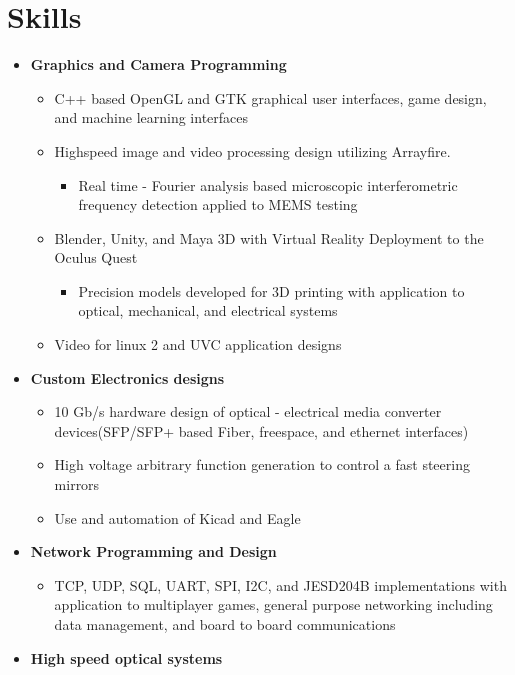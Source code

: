 \documentclass[10pt]{extarticle}
\theoremstyle{plain}
\theoremstyle{Definition}
\theoremstyle{Definition}
\theoremstyle{plain}
\begin{document}
	\section{Skills}
		\begin{itemize}
			\item \textbf{Graphics and Camera Programming}
			\begin{itemize} 
				\item C++ based OpenGL and GTK graphical user interfaces, game design, and machine learning interfaces
				\item Highspeed image and video processing design utilizing Arrayfire. 
				\begin{itemize}
					\item Real time - Fourier analysis based microscopic interferometric frequency detection applied to MEMS testing
				\end{itemize}					
				\item Blender, Unity, and Maya 3D with Virtual Reality Deployment to the Oculus Quest
				\begin{itemize}
					\item Precision models developed for 3D printing with application to optical, mechanical, and electrical systems
				\end{itemize}
				\item Video for linux 2 and UVC application designs
			\end{itemize}
			\item \textbf{Custom Electronics designs}
			\begin{itemize}
				\item 10 Gb/s hardware design of optical - electrical media converter devices(SFP/SFP+ based Fiber, freespace, and ethernet interfaces)
				\item High voltage arbitrary function generation to control a fast steering mirrors
				\item Use and automation of Kicad and Eagle
			\end{itemize}			
			\item \textbf{Network Programming and Design}
			\begin{itemize}
				\item TCP, UDP, SQL, UART, SPI, I2C, and 
				JESD204B implementations with application to multiplayer games, general purpose networking including data management, and board to board communications
			\end{itemize}
			\item \textbf{High speed optical systems }

\end{itemize}
\end{document}
